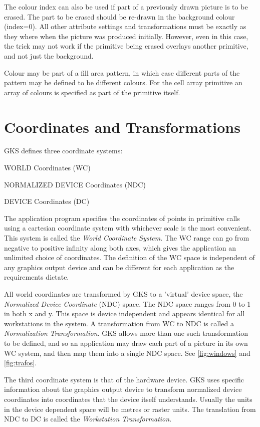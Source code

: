 The colour index can also be used if part of a previously drawn picture
is to be erased. The part to be erased should be re-drawn in
the background colour (index=0).
All other attribute settings and transformations must be
exactly as they where when the picture was produced initially.
However, even in this case, the trick may not work if the primitive
being erased overlays another primitive, and not just the background.
 
Colour may be part of a fill area pattern, in which case different parts
of the pattern may be defined to be different colours.
For the cell array primitive an array of colours is specified
as part of the primitive itself.
\section{Coordinates and Transformations}
 
GKS defines three coordinate systems:
\begin{OL}
\item WORLD Coordinates  (WC)
\item NORMALIZED DEVICE Coordinates  (NDC)
\item DEVICE Coordinates  (DC)
\end{OL}
The application program specifies the coordinates of points in primitive
calls using a cartesian coordinate system with whichever scale
is the most convenient.
This system is called the {\it World Coordinate System}.
The WC range can go from negative to positive infinity along both axes,
which gives the application an unlimited choice of coordinates.
The definition of the WC space is independent of any graphics
output device and can be different for each application as the
requirements dictate.
 
All world coordinates are transformed by GKS to a 'virtual' device
space, the {\it Normalized Device Coordinate} (NDC) space.
The NDC space ranges from 0 to 1 in both x and y.
This space is device independent and appears identical for all
workstations in the system. A transformation from WC to NDC is called a
{\it Normalization Transformation}.
GKS allows more than one such transformation to be defined,
and so an application may draw each part of a picture in
its own WC system, and then map them into a single NDC space.
See \ref{fig:windows} and \ref{fig:trafos}.
 
The third coordinate system is that of the hardware device.
GKS uses specific information about the graphics output device
to transform normalized device coordinates into
coordinates that the device itself understands. Usually the units
in the device dependent space will be metres or raster units.
The translation from NDC to DC is called the
{\it Workstation Transformation}.

